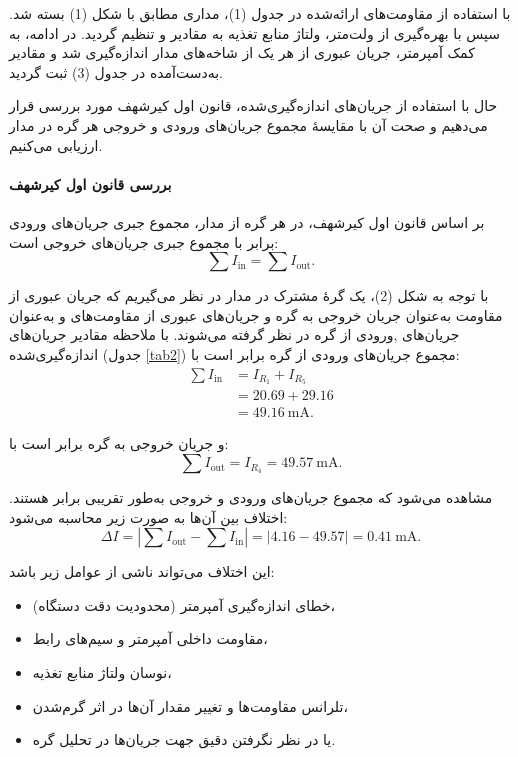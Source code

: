 \documentclass[a4paper, 11pt]{article}
\begin{document}
با استفاده از مقاومت‌های ارائه‌شده در جدول (1)، مداری مطابق با شکل (1) بسته شد. سپس با بهره‌گیری از ولت‌متر، ولتاژ منابع تغذیه به مقادیر  و  تنظیم گردید. در ادامه، به کمک آمپرمتر، جریان عبوری از هر یک از شاخه‌های مدار اندازه‌گیری شد و مقادیر به‌دست‌آمده در جدول (3) ثبت گردید. 


حال با استفاده از جریان‌های اندازه‌گیری‌شده، قانون اول کیرشهف مورد بررسی قرار می‌دهیم و صحت آن با مقایسهٔ مجموع جریان‌های ورودی و خروجی هر گره در مدار ارزیابی می‌کنیم.

\paragraph{بررسی قانون اول کیرشهف}

بر اساس قانون اول کیرشهف، در هر گره از مدار، مجموع جبری جریان‌های ورودی برابر با مجموع جبری جریان‌های خروجی است:
\begin{equation}
\sum I_{\text{in}} = \sum I_{\text{out}}.
\end{equation}

با توجه به شکل (2)، یک گرهٔ مشترک در مدار در نظر می‌گیریم	 که جریان عبوری از مقاومت  به‌عنوان جریان خروجی به گره و جریان‌های عبوری از مقاومت‌های 
  و  به‌عنوان جریان‌های ,ورودی از گره در نظر گرفته می‌شوند. با ملاحظه مقادیر جریان‌های اندازه‌گیری‌شده (جدول \ref{tab2}) 
مجموع جریان‌های ورودی از گره برابر است با:
\begin{align}
\sum I_{\text{in}} &= I_{R_1} + I_{R_5} \nonumber\\
&= 20.69 + 29.16 \nonumber\\
&= 49.16~\mathrm{mA}.
\end{align}

و جریان خروجی به گره برابر است با:
\begin{equation}
\sum I_{\text{out}} = I_{R_4} = 49.57~\mathrm{mA}.
\end{equation}

مشاهده می‌شود که مجموع جریان‌های ورودی و خروجی به‌طور تقریبی برابر هستند. اختلاف بین آن‌ها به صورت زیر محاسبه می‌شود:
\begin{equation}
\Delta I = \left| \sum I_{\text{out}} - \sum I_{\text{in}} \right|
= |4.16 - 49.57|
= 0.41~\mathrm{mA}.
\end{equation}

این اختلاف می‌تواند ناشی از عوامل زیر باشد:
\begin{itemize}
\item خطای اندازه‌گیری آمپرمتر (محدودیت دقت دستگاه)،
\item مقاومت داخلی آمپرمتر و سیم‌های رابط،
\item نوسان ولتاژ منابع تغذیه،
\item تلرانس مقاومت‌ها و تغییر مقدار آن‌ها در اثر گرم‌شدن،
\item یا در نظر نگرفتن دقیق جهت جریان‌ها در تحلیل گره.
\end{itemize}
\end{document}

